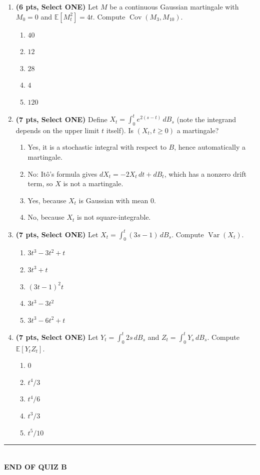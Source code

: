\documentclass[11pt]{article}
\newcommand{\E}{\mathbb{E}}
\DeclareMathOperator{\Var}{Var}
\DeclareMathOperator{\Cov}{Cov}
\begin{document}
\begin{enumerate}
\item[\textbf{Q13.}] \textbf{(6 pts, Select ONE)} Let $M$ be a continuous Gaussian martingale with $M_0=0$ and $\E[M_t^2]=4t$. Compute $\Cov(M_3,M_{10})$.
\begin{enumerate}
  \item $40$
  \item $12$
  \item $28$
  \item $4$
  \item $120$
\end{enumerate}

\item[\textbf{Q14.}] \textbf{(7 pts, Select ONE)} Define $X_t=\int_0^t e^{2(s-t)}\,dB_s$ (note the integrand depends on the upper limit $t$ itself). Is $(X_t,t\ge0)$ a martingale?
\begin{enumerate}
  \item Yes, it is a stochastic integral with respect to $B$, hence automatically a martingale.
  \item No: Itô's formula gives $dX_t=-2X_t\,dt+dB_t$, which has a nonzero drift term, so $X$ is not a martingale.
  \item Yes, because $X_t$ is Gaussian with mean $0$.
  \item No, because $X_t$ is not square-integrable.
\end{enumerate}

\item[\textbf{Q15.}] \textbf{(7 pts, Select ONE)} Let $X_t=\int_0^t(3s-1)\,dB_s$. Compute $\Var(X_t)$.
\begin{enumerate}
  \item $3t^3-3t^2+t$
  \item $3t^3+t$
  \item $(3t-1)^2t$
  \item $3t^3-3t^2$
  \item $3t^3-6t^2+t$
\end{enumerate}

\item[\textbf{Q16.}] \textbf{(7 pts, Select ONE)} Let $Y_t=\int_0^t 2s\,dB_s$ and $Z_t=\int_0^t Y_s\,dB_s$. Compute $\E[Y_tZ_t]$.
\begin{enumerate}
  \item $0$
  \item $t^4/3$
  \item $t^4/6$
  \item $t^3/3$
  \item $t^5/10$
\end{enumerate}

\end{enumerate}

\vspace{10pt}
\begin{center}\rule{0.5\textwidth}{0.4pt}\\[2pt]\textbf{END OF QUIZ B}\end{center}
\end{document}
